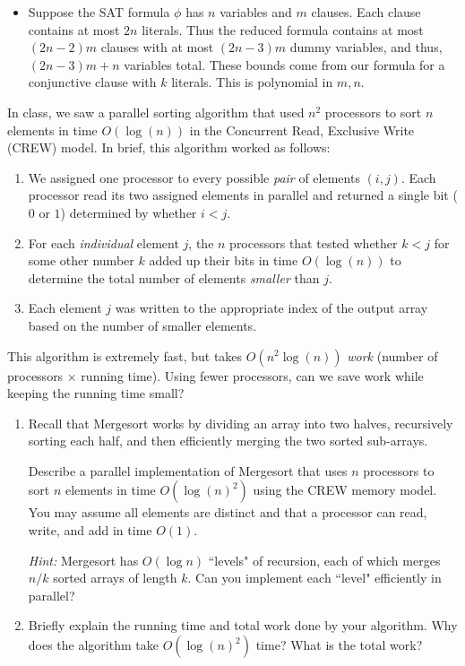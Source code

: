 \documentclass[12 pt, letterpaper]{hmcpset}
\begin{document}
\begin{solution}
\begin{enumerate}[label = (\arabic*)]
\begin{itemize}
				\item Suppose the SAT formula $\phi$ has $n$ variables and $m$ clauses. Each clause contains at most $2n$ literals. Thus the reduced formula contains at most $(2n - 2) m$ clauses with at most $(2n - 3) m$ dummy variables, and thus, $(2n - 3) m + n$ variables total. These bounds come from our formula for a conjunctive clause with $k$ literals. This is polynomial in $m, n$.
			\end{itemize}
	\end{enumerate}
\end{solution}

\pagebreak

\begin{problem}
	In class, we saw a parallel sorting algorithm that used $n^2$ processors to sort $n$ elements in time $O(\log(n))$ in the Concurrent Read, Exclusive Write (CREW) model. In brief, this algorithm worked as follows:
\begin{enumerate}[label = (\arabic*)]
    \item We assigned one processor to every possible \emph{pair} of elements $(i, j)$. Each processor read its two assigned elements in parallel and returned a single bit ($0$ or $1$) determined by whether $i < j$.
    \item For each \emph{individual} element $j$, the $n$ processors that tested whether $k < j$ for some other number $k$ added up their bits in time $O(\log(n))$ to determine the total number of elements \emph{smaller} than $j$.
    \item Each element $j$ was written to the appropriate index of the output array based on the number of smaller elements.
\end{enumerate}

This algorithm is extremely fast, but takes $O(n^2 \log(n))$ \emph{work} (number of processors $\times$ running time). Using fewer processors, can we save work while keeping the running time small?

\begin{enumerate}
    \item Recall that Mergesort works by dividing an array into two halves, recursively sorting each half, and then efficiently merging the two sorted sub-arrays.
    
    Describe a parallel implementation of Mergesort that uses $n$ processors to sort $n$ elements in time $O(\log(n)^2)$ using the CREW memory model. You may assume all elements are distinct and that a processor can read, write, and add in time $O(1)$.

    \emph{Hint:} Mergesort has $O(\log n)$ ``levels" of recursion, each of which merges $n/k$ sorted arrays of length $k$. Can you implement each ``level" efficiently in parallel?
    
    \item Briefly explain the running time and total work done by your algorithm. Why does the algorithm take $O(\log(n)^2)$ time? What is the total work?
\end{enumerate}
\end{problem}
\end{document}
